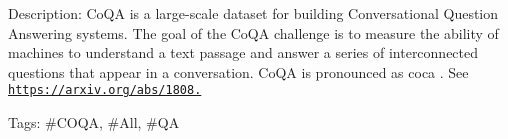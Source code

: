 Description\+: Co\+QA is a large-\/scale dataset for building Conversational Question Answering systems. The goal of the Co\+QA challenge is to measure the ability of machines to understand a text passage and answer a series of interconnected questions that appear in a conversation. Co\+QA is pronounced as coca . See \href{https://arxiv.org/abs/1808.07042}{\tt https\+://arxiv.\+org/abs/1808.}

Tags\+: \#\+C\+O\+QA, \#\+All, \#\+QA 